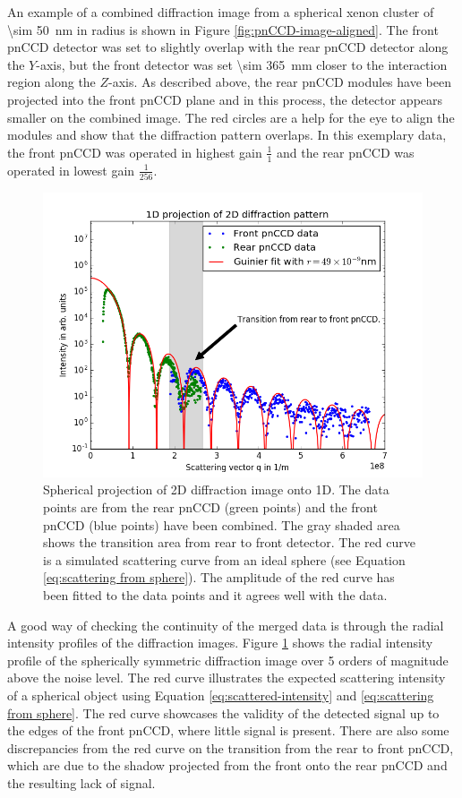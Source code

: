 An example of a combined diffraction image from a spherical xenon cluster of \SI{\sim 50}{\nano\meter} in radius is shown in Figure \ref{fig:pnCCD-image-aligned}. The front pnCCD detector was set to slightly overlap with the rear pnCCD detector along the $Y$-axis, but the front detector was set \SI{\sim 365}{\milli\meter} closer to the interaction region along the $Z$-axis. As described above, the rear pnCCD modules have been projected into the front pnCCD plane and in this process, the detector appears smaller on the combined image. The red circles are a help for the eye to align the modules and show that the diffraction pattern overlaps. In this exemplary data, the front pnCCD was operated in highest gain $\frac{1}{1}$ and the rear pnCCD was operated in lowest gain $\frac{1}{256}$.\\[1\baselineskip]
\begin{figure}
	\centering
		\includegraphics[height=0.50\textwidth]{images/pnCCD-1d-sum.png}
	\caption[Spherical projection of 2D diffraction image onto 1D.]{Spherical projection of 2D diffraction image onto 1D. The data points are from the rear pnCCD (green points) and the front pnCCD (blue points) have been combined. The gray shaded area shows the transition area from rear to front detector. The red curve is a simulated scattering curve from an ideal sphere (see Equation \eqref{eq:scattering from sphere}). The amplitude of the red curve has been fitted to the data points and it agrees well with the data.}
	\label{fig:pnCCD-1d-sum}
\end{figure}
A good way of checking the continuity of the merged data is through the radial intensity profiles of the diffraction images. Figure \ref{fig:pnCCD-1d-sum} shows the radial intensity profile of the spherically symmetric diffraction image over 5 orders of magnitude above the noise level. The red curve illustrates the expected scattering intensity of a spherical object using Equation \eqref{eq:scattered-intensity} and \eqref{eq:scattering from sphere}. The red curve showcases the validity of the detected signal up to the edges of the front pnCCD, where little signal is present. There are also some discrepancies from the red curve on the transition from the rear to front pnCCD, which are due to the shadow projected from the front onto the rear pnCCD and the resulting lack of signal. 
%
%
%

